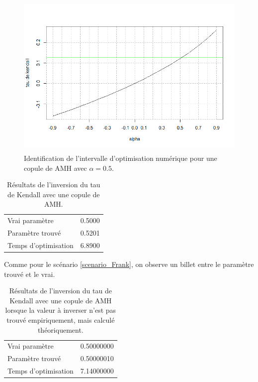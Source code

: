 \documentclass{article}
\begin{document}
 	 \begin{figure}[H]
 	 	\centering
 	 	\includegraphics[height=8cm]{Graph/intevalle_AMH.png}
 	 	\caption[Identification de l'intervalle d'optimisation numérique pour le scénario \ref{scenario_AMH}]
 	 	{Identification de l'intervalle d'optimisation numérique pour une copule de AMH avec $\alpha = 0.5$.} 
 	 	\label{graph_intervalle_AMH}
 	 \end{figure}
  
  	 \begin{table}[H]
  		\centering
  		\begin{tabular}{lr}
  			\hline
  			Vrai paramètre & 0.5000 \\ 
  			Paramètre trouvé & 0.5201 \\ 
  			Temps d'optimisation & 6.8900 \\ 
  			\hline 
  		\end{tabular}
  		\caption{Résultats de l'inversion du tau de Kendall avec une copule de AMH.}
  		\label{tbl_Resultats_AMH}
  	\end{table}
  
  	Comme pour le scénario \ref{scenario_Frank}, on observe un billet entre le paramètre trouvé et le vrai.
  	
  	 \begin{table}[H]
  		\centering
  		\begin{tabular}{lr}
  			\hline
			Vrai paramètre & 0.50000000 \\ 
			Paramètre trouvé & 0.50000010 \\ 
			Temps d'optimisation & 7.14000000 \\ 
  			\hline
  		\end{tabular}
  		\caption{Résultats de l'inversion du tau de Kendall avec une copule de AMH lorsque la valeur à inverser n'est pas trouvé empiriquement, mais calculé théoriquement.}
  		\label{tbl_Resultats_AMH_th}
  	\end{table}
 	 
\end{document}
